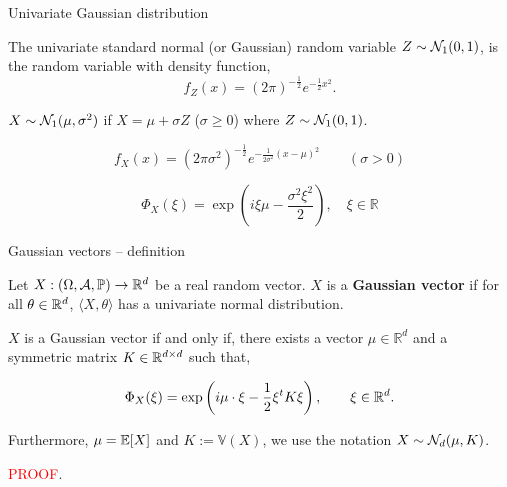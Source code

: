 \documentclass{beamer}
\begin{document}
  \begin{frame}{Univariate Gaussian distribution}

    The univariate standard normal (or Gaussian) random variable  $Z \sim
    \mathcal{N}_1(0,1)$, is the random variable with density function,
    $$f_Z(x)=(2\pi)^{-\frac{1}{2}} e^{-\frac{1}{2}x^{2}}.$$

    \pause

    $X \sim \mathcal{N}_1(\mu,\sigma^2)$ if $X = \mu + \sigma Z$
    ($\sigma \geq 0$) where  $Z \sim \mathcal{N}_1(0,1)$.

    $$f_X(x)=(2
    \pi\sigma^2)^{-\frac{1}{2}} e^{-\frac{1}{2\sigma^2}(x-\mu)^{2}} \qquad
    (\sigma > 0) $$

    \pause

      $$
      \Phi_{X}(\xi)=\exp \left(i\xi \mu -\frac{\sigma^{2} \xi^{2}}{2}\right), \quad \xi \in \mathbb{R}
      $$
  \end{frame}

  \begin{frame}{Gaussian vectors -- definition}
    \begin{definition}
      Let $X:(\Omega,\mathcal{A},\mathbb{P}) \to \mathbb{R}^{d}$ be a real random vector. $X$ is a \textbf{Gaussian
        vector} if for all $\theta \in \mathbb{R}^{d}$, $\langle X, \theta \rangle$ has a
      univariate normal distribution.
    \end{definition}

    \pause

    \begin{theorem} $X$ is a Gaussian vector if and only if, there exists a
      vector $\mu \in \mathbb{R}^{d}$ and a symmetric matrix $K \in \mathbb{R}^{d \times d}$ such that,

      \begin{equation}
        \Phi_{X}(\xi)=\exp \left(i \mu \cdot \xi-\frac{1}{2} \xi^t K \xi\right),
        \qquad \xi \in \mathbb{R}^{d}.
      \end{equation}

      Furthermore, $\mu = \mathbb{E}[X]$ and $K := \mathbb{V}(X)$, we use the notation
      $X \sim \mathcal{N}_d(\mu,K)$.
    \end{theorem}

    \textcolor{red}{PROOF}.
  \end{frame}
\end{document}
